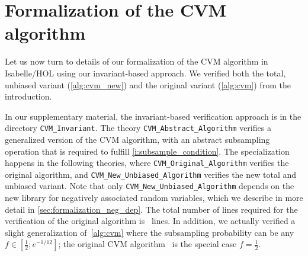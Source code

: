 \section{Formalization of the CVM algorithm}\label{sec:formalization}
Let us now turn to details of our formalization of the CVM algorithm in Isabelle/HOL using our invariant-based approach.
We verified both the total, unbiased variant (\cref{alg:cvm_new}) and the original variant (\cref{alg:cvm}) from the introduction.

\begin{note}
In our supplementary material, the invariant-based verification approach is in the directory \verb|CVM_Invariant|.
The theory \verb|CVM_Abstract_Algorithm| verifies a generalized version of the CVM algorithm, with an abstract subsampling operation that is required to fulfill \cref{i:subsample_condition}.
The specialization happens in the following theories, where \verb|CVM_Original_Algorithm| verifies the original algorithm, and \verb|CVM_New_Unbiased_Algorithm| verifies the new total and unbiased variant.
Note that only \verb|CVM_New_Unbiased_Algorithm| depends on the new library for negatively associated random variables, which we describe in more detail in \cref{sec:formalization_neg_dep}.
The total number of lines required for the verification of the original algorithm is \locnew~lines.
In addition, we actually verified a slight generalization of~\cref{alg:cvm} where the subsampling probability can be any $f \in [\frac{1}{2};e^{-1/12}]$; the original CVM algorithm~\cite{chakraborty2022} is the special case $f=\frac{1}{2}$.
\lipicsEnd\end{note}


